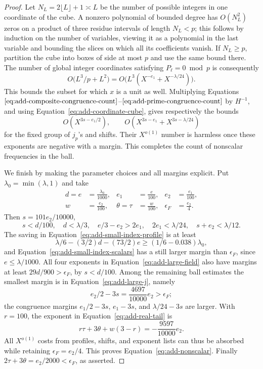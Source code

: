\begin{proof}
Let \(N_L=2\lfloor L\rfloor+1\asymp L\) be the number of possible integers in
one coordinate of the cube.  A nonzero polynomial of bounded degree has
\(O(N_L^2)\) zeros on a product of three residue intervals of length \(N_L<p\);
this follows by induction on the number of variables, viewing it as a
polynomial in the last variable and bounding the slices on which all its
coefficients vanish.  If \(N_L\ge p\), partition the cube into boxes of side
at most \(p\) and use the same bound there.  The number of global integer
coordinates satisfying \(P_\ell=0\bmod p\) is consequently
\begin{equation}
 O\bigl(L^3/p+L^2\bigr)
   =O\bigl(L^3(X^{-e_1}+X^{-\lambda/24})\bigr).
 \label{eq:add-prime-congruence-count}
\end{equation}
This bounds the subset for which \(x\) is a unit as well.
Multiplying Equations
\(\eqref{eq:add-composite-congruence-count}\)--\(\eqref{eq:add-prime-congruence-count}\)
by \(H^{-1}\), and using Equation~\eqref{eq:add-coordinate-cube}, gives
respectively the bounds
\[
 O(X^{3s-e_1/2}),\qquad
 O(X^{3s-e_1}+X^{3s-\lambda/24})
\]
for the fixed group of \(j_p\)'s and shifts.  Their \(X^{o(1)}\) number is
harmless once these exponents are negative with a margin.  This completes
the count of nonscalar frequencies in the ball.

We finish by making the parameter choices and all margins explicit.  Put
\(\lambda_0=\min(\lambda,1)\) and take
\begin{equation}
 \begin{aligned}
 d=e&=\frac{\lambda_0}{1000},&
 e_1&=\frac e{100},&
 e_2&=\frac{e_1}{100},\\
 w&=\frac{e_2}{100},&
 \theta=\tau&=\frac w{100},&
 \epsilon_F&=\frac{e_2}{4}.
 \end{aligned}
 \label{eq:add-parameters}
\end{equation}
Then \(s=101e_2/10000\),
\[
 s<d/100,\quad d<\lambda/3,\quad
 e/3-e_2>2e_1,\quad 2e_1<\lambda/24,\quad
 s+e_2<\lambda/12.
\]
The saving in Equation~\eqref{eq:add-small-index-profile} is at least
\[
 \lambda/6-(3/2)d-(73/2)e
    \ge (1/6-0.038)\lambda_0,
\]
and Equation~\eqref{eq:add-small-index-scalars} has a still larger margin
than \(\epsilon_F\), since \(e\le\lambda/1000\).
All four exponents in Equation~\eqref{eq:add-large-field} also have margins
at least \(29d/900>\epsilon_F\), by \(s<d/100\).
Among the remaining ball estimates the smallest
margin is in Equation~\eqref{eq:add-large-j}, namely
\[
 e_2/2-3s=\frac{4697}{10000}e_2>\epsilon_F;
\]
the congruence margins \(e_1/2-3s\), \(e_1-3s\), and
\(\lambda/24-3s\) are larger.  With \(r=100\),
the exponent in Equation~\eqref{eq:add-real-tail} is
\[
 r\tau+3\theta+w(3-r)=-\frac{9597}{10000}e_2.
\]
All \(X^{o(1)}\) costs from profiles, shifts, and exponent lists can thus be
absorbed while retaining \(\epsilon_F=e_2/4\).  This proves
Equation~\eqref{eq:add-nonscalar}.  Finally
\(2\tau+3\theta=e_2/2000<\epsilon_F\), as asserted.
\end{proof}

